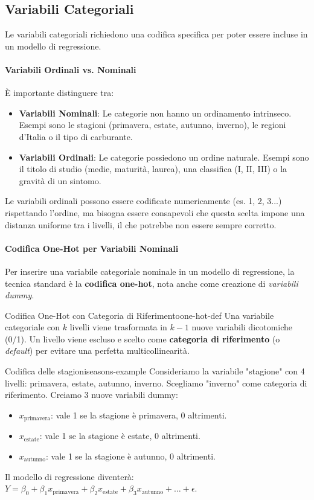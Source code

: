 \subsection{Variabili Categoriali}
Le variabili categoriali richiedono una codifica specifica per poter essere
incluse in un modello di regressione.

\paragraph{Variabili Ordinali vs. Nominali}
È importante distinguere tra:
\begin{itemize}
    \item \textbf{Variabili Nominali}: Le categorie non hanno un ordinamento
    intrinseco. Esempi sono le stagioni (primavera, estate, autunno, inverno),
    le regioni d'Italia o il tipo di carburante.
    \item \textbf{Variabili Ordinali}: Le categorie possiedono un ordine
    naturale. Esempi sono il titolo di studio (medie, maturità, laurea), una
    classifica (I, II, III) o la gravità di un sintomo.
\end{itemize}
Le variabili ordinali possono essere codificate numericamente (es. 1, 2, 3...)
rispettando l'ordine, ma bisogna essere consapevoli che questa scelta impone una
distanza uniforme tra i livelli, il che potrebbe non essere sempre corretto.

\paragraph{Codifica One-Hot per Variabili Nominali}
Per inserire una variabile categoriale nominale in un modello di regressione, la
tecnica standard è la \textbf{codifica one-hot}, nota anche come creazione di
\textit{variabili dummy}.

\begin{definizione}{Codifica One-Hot con Categoria di Riferimento}{one-hot-def}
Una variabile categoriale con \(k\) livelli viene trasformata in \(k-1\) nuove
variabili dicotomiche (0/1). Un livello viene escluso e scelto come
\textbf{categoria di riferimento} (o \textit{default}) per evitare una perfetta
multicollinearità.
\end{definizione}

\begin{esempio}{Codifica delle stagioni}{seasons-example}
Consideriamo la variabile "stagione" con 4 livelli: primavera, estate, autunno,
inverno. Scegliamo "inverno" come categoria di riferimento. Creiamo 3 nuove
variabili dummy:
\begin{itemize}
    \item \(x_{\text{primavera}}\): vale 1 se la stagione è primavera, 0
    altrimenti.
    \item \(x_{\text{estate}}\): vale 1 se la stagione è estate, 0 altrimenti.
    \item \(x_{\text{autunno}}\): vale 1 se la stagione è autunno, 0
    altrimenti.
\end{itemize}
Il modello di regressione diventerà: \( Y = \beta_0 + \beta_1
x_{\text{primavera}} + \beta_2 x_{\text{estate}} + \beta_3 x_{\text{autunno}} +
\dots + \epsilon \).
\end{esempio}

